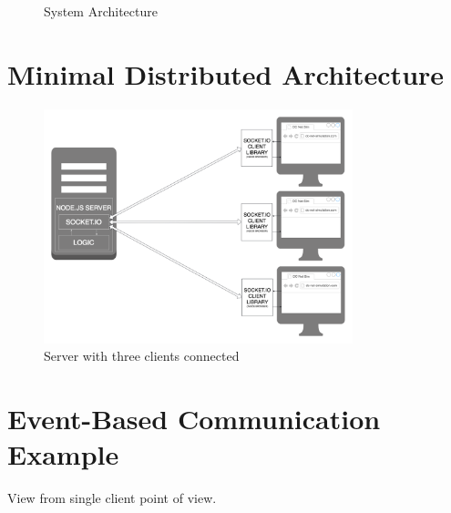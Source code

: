 \begin{figure}[H]
    \centering
    \caption{System Architecture}
    \label{fig:systemArchitecture}
\end{figure}



\section{Minimal Distributed Architecture}

\begin{figure}[H]
    \centering
    \includegraphics[width=0.8\textwidth]{Images/Design/distributedArchitecture.png}
    \caption{Server with three clients connected}
    \label{fig:distrubtedArchitecture}
\end{figure}


\section{Event-Based Communication Example}
View from single client point of view.

